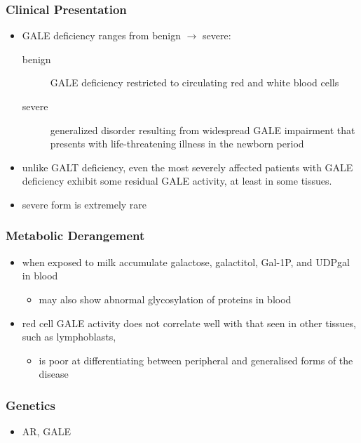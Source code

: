 \documentclass{scrartcl}
\begin{document}
\subsubsection{Clinical Presentation}
\label{sec:org334bc36}
\begin{itemize}
\item GALE deficiency ranges from benign \(\to\) severe:
\begin{description}
\item[{benign}] GALE deficiency restricted to circulating red and white blood cells
\item[{severe}] generalized disorder resulting from widespread GALE
impairment that presents with life-threatening illness
in the newborn period
\end{description}

\item unlike GALT deficiency, even the most severely affected patients
with GALE deficiency exhibit some residual GALE activity, at least
in some tissues.
\item severe form is extremely rare
\end{itemize}

\subsubsection{Metabolic Derangement}
\label{sec:org5f923b1}
\begin{itemize}
\item when exposed to milk accumulate galactose, galactitol, Gal-1P, and
UDPgal in blood
\begin{itemize}
\item may also show abnormal glycosylation of proteins in blood
\end{itemize}
\item red cell GALE activity does not correlate well with that seen in
other tissues, such as lymphoblasts,
\begin{itemize}
\item is poor at differentiating between peripheral and generalised forms of the disease
\end{itemize}
\end{itemize}

\subsubsection{Genetics}
\label{sec:org53b30e6}
\begin{itemize}
\item AR, GALE
\end{itemize}
\end{document}
